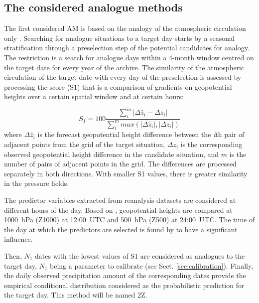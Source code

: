 \documentclass[hess, manuscript]{copernicus}
\begin{document}
	\subsection{The considered analogue methods}
	\label{sec:analog_method}
	
	The first considered AM is based on the analogy of the atmospheric circulation only \citep[Table \ref{table:method_2Z},][]{Obled2002, Bontron2005}. Searching for analogue situations to a target day starts by a seasonal stratification through a preselection step of the potential candidates for analogy. The restriction is a search for analogue days within a 4-month window centred on the target date for every year of the archive. The similarity of the atmospheric circulation of the target date with every day of the preselection is assessed by processing the \citet{Teweles1954} score (S1) that is a comparison of gradients on geopotential heights over a certain spatial window and at certain hours:
	
	\begin{equation}
	\label{eq:S1}
	S_{1}=100 \frac {\displaystyle \sum_{i}^{m} \vert \Delta\hat{z}_{i} - \Delta z_{i} \vert}
	{\displaystyle \sum_{i}^{m} max( \vert \Delta\hat{z}_{i} \vert , \vert \Delta z_{i} \vert ) }
	\end{equation}
	where $\Delta \hat{z}_{i}$ is the forecast geopotential height difference between the \textit{i}th pair of adjacent points from the grid of the target situation, $\Delta z_{i}$ is the corresponding observed geopotential height difference in the candidate situation, and $m$ is the number of pairs of adjacent points in the grid. The differences are processed separately in both directions. With smaller S1 values, there is greater similarity in the pressure fields.
	
	The predictor variables extracted from reanalysis datasets are considered at different hours of the day. Based on \citet{Bontron2005}, geopotential heights are compared at 1000~hPa (Z1000) at 12:00~UTC and 500~hPa (Z500) at 24:00~UTC. The time of the day at which the predictors are selected is found by \citet{Bontron2004} to have a significant influence.
	
	Then, $N_{1}$ dates with the lowest values of S1 are considered as analogues to the target day, $N_{1}$ being a parameter to calibrate (see Sect. \ref{sec:calibration}). Finally, the daily observed precipitation amount of the corresponding dates provide the empirical conditional distribution considered as the probabilistic prediction for the target day. This method will be named 2Z.
	
\end{document}
